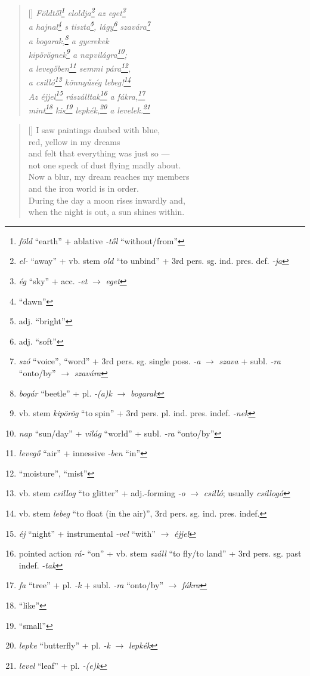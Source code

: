\documentclass[a4paper,12pt,twoside,final]{book}
\begin{document}
\begin{verse}[\versewidth]
  \it
  Földtől\footnote{\emph{föld} ``earth'' +
  ablative \emph{-től} ``without/from''} eloldja\footnote{\emph{el-} ``away''
  + vb. stem \emph{old} ``to unbind'' + 3rd
  pers. sg. ind. pres. def. \emph{-ja}} az eget\footnote{\emph{ég}
  ``sky'' + acc. \emph{-et} $\rightarrow$ \emph{eget}} \\
  a hajnal\footnote{``dawn''} s tiszta\footnote{adj. ``bright''},
  lágy\footnote{adj. ``soft''} szavára\footnote{\emph{szó} ``voice'',
  ``word'' + 3rd pers. sg. single poss. \emph{-a} $\rightarrow$
  \emph{szava} + subl. \emph{-ra} ``onto/by'' $\rightarrow$
  \emph{szavára}} \\

  a bogarak,\footnote{\emph{bogár} ``beetle'' + pl. \emph{-(a)k}
  $\rightarrow$ \emph{bogarak}} a gyerekek \\
  kipörögnek\footnote{vb. stem \emph{kipörög} ``to spin'' + 3rd
  pers. pl. ind. pres. indef. \emph{-nek}}
  a napvilágra\footnote{\emph{nap} ``sun/day'' + \emph{világ}
  ``world'' + subl. \emph{-ra} ``onto/by''}; \\
  a levegőben\footnote{\emph{levegő} ``air'' +
  innessive \emph{-ben} ``in''} semmi pára\footnote{``moisture'', ``mist''}, \\
  a csilló\footnote{vb. stem \emph{csillog} ``to glitter'' +
  adj.-forming \emph{-o} $\rightarrow$
  \emph{csilló}; usually \emph{csillogó}} könnyűség
  lebeg!\footnote{vb. stem \emph{lebeg} ``to float (in the air)'', 3rd
  pers. sg. ind. pres. indef.} \\
  Az éjjel\footnote{\emph{éj} ``night'' + instrumental \emph{-vel}
  ``with'' $\rightarrow$ \emph{éjjel}} rászálltak\footnote{pointed
  action \emph{rá-} ``on'' + vb. stem \emph{száll} ``to fly/to
  land'' + 3rd pers. sg. past indef. \emph{-tak}} a
  fákra,\footnote{\emph{fa} ``tree'' +
  pl. \emph{-k} + subl. \emph{-ra} ``onto/by'' $\rightarrow$ \emph{fákra}} \\
  mint\footnote{``like''} kis\footnote{``small''} lepkék,\footnote{\emph{lepke}
  ``butterfly'' + pl. \emph{-k} $\rightarrow$ \emph{lepkék}} a
  levelek.\footnote{\emph{level} ``leaf'' + pl. \emph{-(e)k}}
\end{verse}

\newpage


\settowidth{\versewidth}{Now a blur, my dream reaches my members}

\begin{verse}[\versewidth]
  I saw paintings daubed with blue, \\
  red, yellow in my dreams \\
  and felt that everything was just so ---\\
  not one speck of dust flying madly about. \\
  Now a blur, my dream reaches my members \\
  and the iron world is in order. \\
  During the day a moon rises inwardly and, \\
  when the night is out, a sun shines within.
\end{verse}
\end{document}
